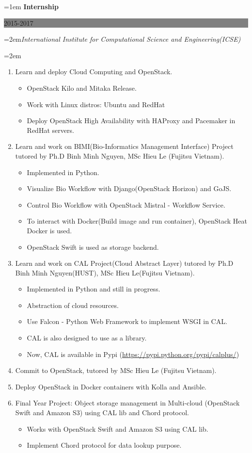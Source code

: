 \documentclass[paper=a4,fontsize=11pt]{scrartcl} %
\newcommand{\EducationEntry}[4]{
		\noindent\hangindent=1em\hangafter=0 \large\textbf{#1} \hfill      %
		\colorbox{Gray}{%
			\parbox{6.5em}{%
			\hfill\color{White}\large #2}} \par  %
		\noindent\hangindent=2em\hangafter=0\large\textit{#3} \par        %
		\noindent\hangindent=2em\hangafter=0\large{#4} %
		\normalsize \par}
\begin{document}
\EducationEntry{Internship \vspace*{0.3em}}{2015-2017}{International Institute for Computational Science and Engineering(ICSE)}{
\begin{enumerate}
	\setlength{\itemindent}{+1em}
    \item{Learn and deploy Cloud Computing and OpenStack.}
      \begin{itemize}
          \item{OpenStack Kilo and Mitaka Release.}
          \item{Work with Linux distros: Ubuntu and RedHat}
          \item{Deploy OpenStack High Availability with HAProxy and Pacemaker in RedHat servers.}
      \end{itemize}
	\item{Learn and work on BIMI(Bio-Informatics Management Interface) Project tutored by Ph.D Binh Minh Nguyen, MSc Hieu Le (Fujitsu Vietnam).}
      \begin{itemize}
      	  \item{Implemented in Python.}
          \item{Visualize Bio Workflow with Django(OpenStack Horizon) and GoJS.}
          \item{Control Bio Workflow with OpenStack Mistral - Workflow Service.}
          \item{To interact with Docker(Build image and run container), OpenStack Heat Docker is used.}
          \item{OpenStack Swift is used as storage backend.}
      \end{itemize}
	\item{Learn and work on CAL Project(Cloud Abstract Layer) tutored by Ph.D Binh Minh Nguyen(HUST), MSc Hieu Le(Fujitsu Vietnam).}
      \begin{itemize}
		  \item{Implemented in Python and still in progress.}
          \item{Abstraction of cloud resources.}
          \item{Use Falcon - Python Web Framework to implement WSGI in CAL.}
          \item{CAL is also designed to use as a library.}
          \item{Now, CAL is available in Pypi (\url{https://pypi.python.org/pypi/calplus/})}
	  \end{itemize}
    \item{Commit to OpenStack, tutored by MSc Hieu Le (Fujitsu Vietnam).}
    \item{Deploy OpenStack in Docker containers with Kolla and Ansible.}
    \item{Final Year Project: Object storage management in Multi-cloud (OpenStack Swift and Amazon S3) using CAL lib and Chord protocol.}
       \begin{itemize}
          \item{Works with OpenStack Swift and Amazon S3 using CAL lib.}
          \item{Implement Chord protocol for data lookup purpose.}
       \end{itemize}
\end{enumerate}}
\end{document}
